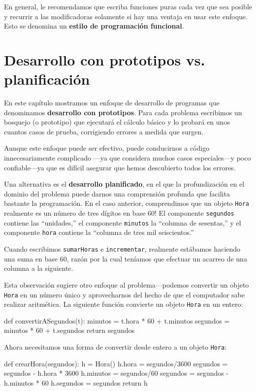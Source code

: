 En general, le recomendamos que escriba funciones puras cada vez que
sea posible y recurrir a las modificadoras solamente si hay una ventaja
en usar este enfoque. Esto se denomina un \textbf{estilo de programación
funcional}.

\section{Desarrollo con prototipos vs. planificación}

\label{convert} 

En este capítulo mostramos un enfoque de desarrollo de programas que
denominamos \textbf{desarrollo con prototipos}. Para cada problema
escribimos un bosquejo (o prototipo) que ejecutará el cálculo básico
y lo probará en unos cuantos casos de prueba, corrigiendo errores
a medida que surgen.

Aunque este enfoque puede ser efectivo, puede conducirnos a código
innecesariamente complicado —ya que considera muchos casos especiales—y
poco confiable—ya que es difícil asegurar que hemos descubierto todos
los errores.

Una alternativa es el \textbf{desarrollo planificado}, en el que la
profundización en el dominio del problema puede darnos una comprensión
profunda que facilita bastante la programación. En el caso anterior,
comprendimos que un objeto \texttt{Hora} realmente es un número de
tres dígitos en base 60! El componente \texttt{segundos} contiene
las ``unidades,'' el componente \texttt{minutos} la ``columna de
sesentas,'' y el componente \texttt{hora} contiene la ``columna
de tres mil seiscientos.''

Cuando escribimos \texttt{sumarHoras} e \texttt{incrementar}, realmente
estábamos haciendo una suma en base 60, razón por la cual teníamos
que efectuar un acarreo de una columna a la siguiente.

Esta observación sugiere otro enfoque al problema—podemos convertir
un objeto \texttt{Hora} en un número único y aprovecharnos del hecho
de que el computador sabe realizar aritmética. La siguiente función
convierte un objeto \texttt{Hora} en un entero:
\begin{pythoncode}
def convertirASegundos(t):
  minutos = t.hora * 60 + t.minutos
  segundos = minutos * 60 + t.segundos
  return segundos
\end{pythoncode}

Ahora necesitamos una forma de convertir desde entero a un objeto
\texttt{Hora}:
\begin{pythoncode}
def crearHora(segundos):
  h = Hora()
  h.hora = segundos/3600
  segundos = segundos - h.hora * 3600
  h.minutos = segundos/60
  segundos = segundos - h.minutos * 60
  h.segundos = segundos
  return h
\end{pythoncode}

